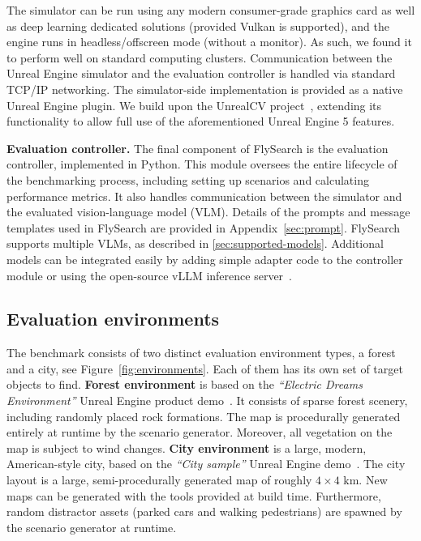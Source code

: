 \documentclass{article}
\theoremstyle{plain}
\theoremstyle{definition}
\theoremstyle{remark}
\newcommand{\ours}{FlySearch}
\begin{document}
The simulator can be run using any modern consumer-grade graphics card as well as deep learning dedicated solutions (provided Vulkan is supported), and the engine runs in headless/offscreen mode (without a monitor). As such, we found it to perform well on standard computing clusters.
Communication between the Unreal Engine simulator and the evaluation controller is handled via standard TCP/IP networking. The simulator-side implementation is provided as a native Unreal Engine plugin. We build upon the UnrealCV project~\cite{qiu2017unrealcv}, extending its functionality to allow full use of the aforementioned Unreal Engine 5 features.



\textbf{Evaluation controller.}
The final component of \ours{} is the evaluation controller, implemented in Python. This module oversees the entire lifecycle of the benchmarking process, including setting up scenarios and calculating performance metrics. It also handles communication between the simulator and the evaluated vision-language model (VLM). Details of the prompts and message templates used in \ours{} are provided in Appendix~\ref{sec:prompt}.
\ours{} supports multiple VLMs, as described in \cref{sec:supported-models}. Additional models can be integrated easily by adding simple adapter code to the controller module or using the open-source vLLM inference server~\cite{kwon2023efficient}.

\subsection{Evaluation environments}

The benchmark consists of two distinct evaluation environment types, a forest and a city, see Figure~\ref{fig:environments}. Each of them has its own set of target objects to find.
\textbf{Forest environment} is based on the \textit{``Electric Dreams Environment''} Unreal Engine product demo~\cite{electridreams}. It consists of sparse forest scenery, including randomly placed rock formations. The map is procedurally generated entirely at runtime by the scenario generator. Moreover, all vegetation on the map is subject to wind changes.  
\textbf{City environment} is a large, modern, American-style city, based on the \textit{``City sample''} Unreal Engine demo~\cite{citysample}. The city layout is a large, semi-procedurally generated map of roughly $4\times4$ km. New maps can be generated with the tools provided at build time. Furthermore, random distractor assets (parked cars and walking pedestrians) are spawned by the scenario generator at runtime. 
\end{document}
